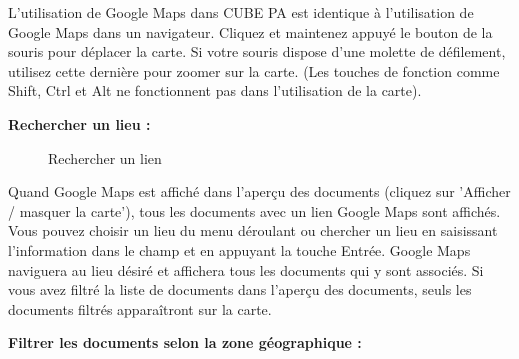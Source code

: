 L'utilisation de Google Maps dans CUBE PA est identique à l'utilisation de Google Maps dans un navigateur. Cliquez et maintenez appuyé le bouton de la souris pour déplacer la carte. Si votre souris dispose d'une molette de défilement, utilisez cette dernière pour zoomer sur la carte. (Les touches de fonction comme Shift, Ctrl et Alt ne fonctionnent pas dans l'utilisation de la carte).

\vspace{\baselineskip}

\textbf{Rechercher un lieu :} 

\begin{figure}[H]
\caption{Rechercher un lien}
\end{figure}

Quand Google Maps est affiché dans l'aperçu des documents (cliquez sur 'Afficher / masquer la carte'), tous les documents avec un lien Google Maps sont affichés. Vous pouvez choisir un lieu du menu déroulant  ou chercher un lieu en saisissant l'information dans le champ  et en appuyant la touche Entrée. Google Maps naviguera au lieu désiré et affichera tous les documents qui y sont associés. Si vous avez filtré la liste de documents dans l'aperçu des documents, seuls les documents filtrés apparaîtront sur la carte. %

\pagebreak
\textbf{Filtrer les documents selon la zone géographique :} \\

